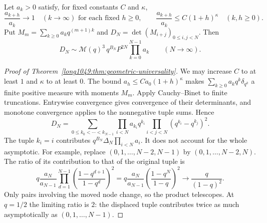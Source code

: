 \documentclass[11pt]{article}
\begin{document}
\begin{theorem}
\label{long1049:thm:geometric-universality}
Let $a_k>0$ satisfy, for fixed constants $C$ and $\kappa$,
\[
 \frac{a_{k+h}}{a_k}\longrightarrow1\quad(k\to\infty)
 \text{ for each fixed }h\ge0,
 \qquad
 \frac{a_{k+h}}{a_k}\le C(1+h)^\kappa\quad(k,h\ge0).
\]
Put $M_m=\sum_{k\ge0}a_kq^{(m+1)k}$ and $D_N=\det(M_{i+j})_{0\le i,j<N}$. Then
\[
 D_N\sim\mathcal M(q)^3\,q^{B_N}P^{2N}\prod_{k=0}^{N-1}a_k
 \qquad(N\to\infty).
\]
\end{theorem}

\begin{proof}[Proof of Theorem~\ref{long1049:thm:geometric-universality}]
We may increase $C$ to at least $1$ and $\kappa$ to at least $0$.
The bound $a_h\le Ca_0(1+h)^\kappa$ makes
$\sum_{k\ge0}a_kq^k\delta_{q^k}$ a finite positive measure with
moments $M_m$. Apply Cauchy--Binet to finite truncations. Entrywise
convergence gives convergence of their determinants, and monotone
convergence applies to the nonnegative tuple sums. Hence
\begin{equation}\label{long1049:eq:polynomial-heine}
 D_N=\sum_{0\le k_0<\cdots<k_{N-1}}
 \prod_{i<N}a_{k_i}q^{k_i}
 \prod_{i<j<N}(q^{k_i}-q^{k_j})^2.
\end{equation}
The tuple $k_i=i$ contributes $q^{B_N}\Delta_N\prod_{i<N}a_i$.
It does not account for the whole asymptotic. For example, replace
$(0,1,\ldots,N-2,N-1)$ by $(0,1,\ldots,N-2,N)$. The ratio of
its contribution to that of the original tuple is
\begin{equation}\label{long1049:eq:last-node-shift}
 q\frac{a_N}{a_{N-1}}
 \prod_{d=1}^{N-1}\left(\frac{1-q^{d+1}}{1-q^d}\right)^2
 =q\frac{a_N}{a_{N-1}}\left(\frac{1-q^N}{1-q}\right)^2
 \longrightarrow\frac{q}{(1-q)^2}.
\end{equation}
Only pairs involving the moved node change, so the product
telescopes. At $q=1/2$ the limiting ratio is $2$: the displaced tuple
contributes twice as much asymptotically as $(0,1,\ldots,N-1)$.


\end{proof}
\end{document}
